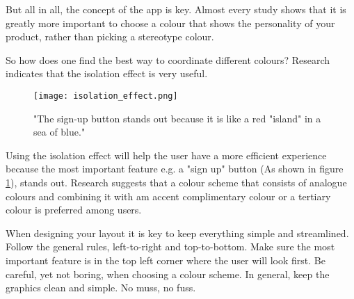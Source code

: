 But all in all, the concept of the app is key. Almost every study shows that it is greatly more important to choose a colour that shows the personality of your product, rather than picking a stereotype colour. \cite{ColorMeaning}

So how does one find the best way to coordinate different colours? Research indicates that the isolation effect is very useful.

\begin{figure}[H]
\centering
\texttt{[image: isolation\_effect.png]}
\caption{"The sign-up button stands out because it is like a red "island" in a sea of blue." \cite{ColorMeaning}}
\label{isolationFig}
\end{figure}

Using the isolation effect will help the user have a more efficient experience because the most important feature e.g. a "sign up" button (As shown in figure \ref{isolationFig}), stands out. \cite{ColorMeaning} 
Research suggests that a colour scheme that consists of analogue colours and combining it with am accent complimentary colour or a tertiary colour is preferred among users. \cite{ColorMeaning} 

When designing your layout it is key to keep everything simple and streamlined. 
Follow the general rules, left-to-right and top-to-bottom. Make sure the most important feature is in the top left corner where the user will look first.\cite{Sardo}
Be careful, yet not boring, when choosing a colour scheme. In general, keep the graphics clean and simple. No muss, no fuss. 